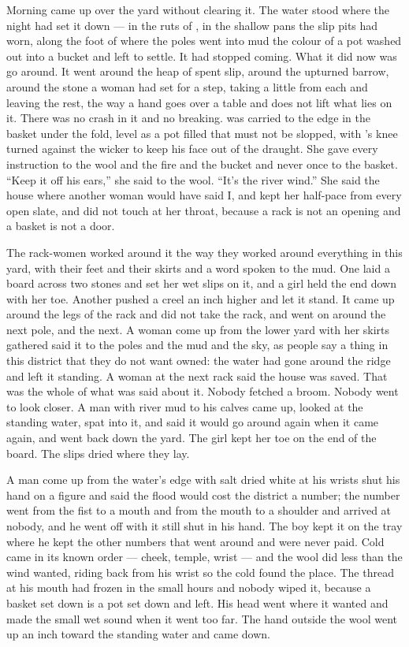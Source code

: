 
Morning came up over the yard without clearing it. The water stood where the night had set it down — in the ruts of , in the shallow pans the slip pits had worn, along the foot of  where the poles went into mud the colour of a pot washed out into a bucket and left to settle. It had stopped coming. What it did now was go around. It went around the heap of spent slip, around the upturned barrow, around the stone a woman had set for a step, taking a little from each and leaving the rest, the way a hand goes over a table and does not lift what lies on it. There was no crash in it and no breaking.  was carried to the edge in the basket under the fold, level as a pot filled that must not be slopped, with 's knee turned against the wicker to keep his face out of the draught. She gave every instruction to the wool and the fire and the bucket and never once to the basket. “Keep it off his ears,” she said to the wool. “It's the river wind.” She said the house where another woman would have said I, and kept her half-pace from every open slate, and did not touch  at her throat, because a rack is not an opening and a basket is not a door.

The rack-women worked around it the way they worked around everything in this yard, with their feet and their skirts and a word spoken to the mud. One laid a board across two stones and set her wet slips on it, and a girl held the end down with her toe. Another pushed a creel an inch higher and let it stand. It came up around the legs of the rack and did not take the rack, and went on around the next pole, and the next. A woman come up from the lower yard with her skirts gathered said it to the poles and the mud and the sky, as people say a thing in this district that they do not want owned: the water had gone around the ridge and left it standing. A woman at the next rack said the house was saved. That was the whole of what was said about it. Nobody fetched a broom. Nobody went to look closer. A man with river mud to his calves came up, looked at the standing water, spat into it, and said it would go around again when it came again, and went back down the yard. The girl kept her toe on the end of the board. The slips dried where they lay.

A man come up from the water's edge with salt dried white at his wrists shut his hand on a figure and said the flood would cost the district a number; the number went from the fist to a mouth and from the mouth to a shoulder and arrived at nobody, and he went off with it still shut in his hand. The boy kept it on the tray where he kept the other numbers that went around and were never paid. Cold came in its known order — cheek, temple, wrist — and the wool did less than the wind wanted, riding back from his wrist so the cold found the place. The thread at his mouth had frozen in the small hours and nobody wiped it, because a basket set down is a pot set down and left. His head went where it wanted and made the small wet sound when it went too far. The hand outside the wool went up an inch toward the standing water and came down.

